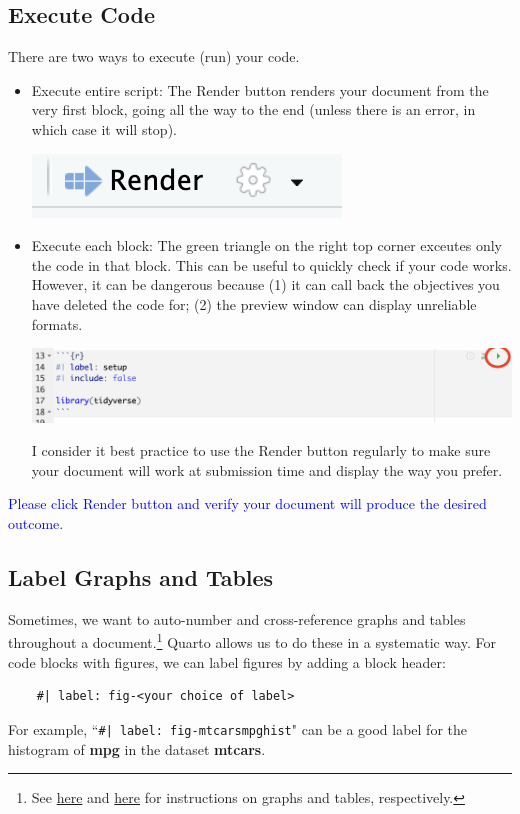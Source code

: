 \documentclass[12pt]{article}
\begin{document}
\subsection{Execute Code}
There are two ways to execute (run) your code.
\begin{itemize}
    \item Execute entire script: The Render button renders your document from the very first block, going all the way to the end (unless there is an error, in which case it will stop).
    \begin{center}
        \includegraphics[scale=.8]{render.png}
    \end{center}
    \item Execute each block: The green triangle on the right top corner exceutes only the code in that block. This can be useful to quickly check if your code works. However, it can be dangerous because (1) it can call back the objectives you have deleted the code for; (2) the preview window can display unreliable formats.
    \begin{center}
        \includegraphics[scale=.5]{greentriangle.png}
    \end{center}
    I consider it best practice to use the Render button regularly to make sure your document will work at submission time and display the way you prefer. 
\end{itemize}
\textcolor{blue}{Please click Render button and verify your document will produce the desired outcome.}

\subsection{Label Graphs and Tables}
Sometimes, we want to auto-number and cross-reference graphs and tables throughout a document.\footnote{See \href{https://quarto.org/docs/authoring/figures.html\#cross-references}{here} and \href{https://quarto.org/docs/authoring/tables.html\#cross-references}{here} for instructions on graphs and tables, respectively.} Quarto allows us to do these in a systematic way. For code blocks with figures, we can label figures by adding a block header:
\begin{verbatim}
    #| label: fig-<your choice of label>
\end{verbatim}
For example, ``\verb!#| label: fig-mtcarsmpghist!" can be a good label for the histogram of \textbf{mpg} in the dataset \textbf{mtcars}.
\end{document}
